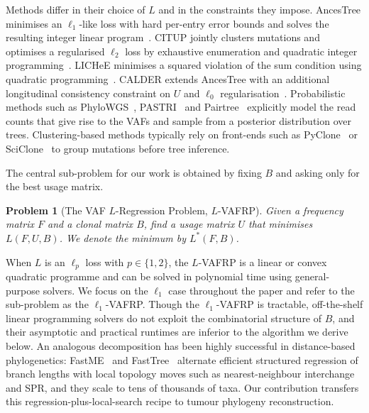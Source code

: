 \documentclass[11pt]{article}
\newtheorem{problem}[theorem]{Problem}
\begin{document}
Methods differ in their choice of $L$ and in the constraints they impose. AncesTree minimises an $\ell_1$-like loss with hard per-entry error bounds and solves the resulting integer linear program~\citep{elkebir2015reconstruction}. CITUP jointly clusters mutations and optimises a regularised $\ell_2$ loss by exhaustive enumeration and quadratic integer programming~\citep{malikic2015citup}. LICHeE minimises a squared violation of the sum condition using quadratic programming~\citep{popic2015lichee}. CALDER extends AncesTree with an additional longitudinal consistency constraint on $U$ and $\ell_0$ regularisation~\citep{myers2019calder}. Probabilistic methods such as PhyloWGS~\citep{deshwar2015phylowgs}, PASTRI~\citep{satas2017pastri} and Pairtree~\citep{wintersinger2022pairtree} explicitly model the read counts that give rise to the VAFs and sample from a posterior distribution over trees. Clustering-based methods typically rely on front-ends such as PyClone~\citep{roth2014pyclone} or SciClone~\citep{miller2014sciclone} to group mutations before tree inference.

The central sub-problem for our work is obtained by fixing $B$ and asking only for the best usage matrix.

\begin{problem}[The VAF $L$-Regression Problem, $L$-VAFRP]
Given a frequency matrix $F$ and a clonal matrix $B$, find a usage matrix $U$ that minimises $L(F, U, B)$. We denote the minimum by $L^*(F, B)$.
\end{problem}

When $L$ is an $\ell_p$ loss with $p\in\{1,2\}$, the $L$-VAFRP is a linear or convex quadratic programme and can be solved in polynomial time using general-purpose solvers. We focus on the $\ell_1$ case throughout the paper and refer to the sub-problem as the $\ell_1$-VAFRP. Though the $\ell_1$-VAFRP is tractable, off-the-shelf linear programming solvers do not exploit the combinatorial structure of $B$, and their asymptotic and practical runtimes are inferior to the algorithm we derive below. An analogous decomposition has been highly successful in distance-based phylogenetics: FastME~\citep{desper2002fastme,lefort2015fastme} and FastTree~\citep{price2010fasttree} alternate efficient structured regression of branch lengths with local topology moves such as nearest-neighbour interchange and SPR, and they scale to tens of thousands of taxa. Our contribution transfers this regression-plus-local-search recipe to tumour phylogeny reconstruction.
\end{document}
